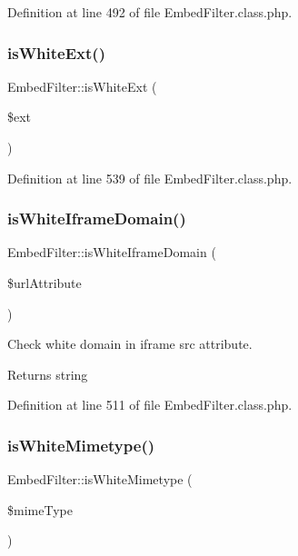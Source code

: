 Definition at line 492 of file Embed\+Filter.\+class.\+php.

\mbox{\label{classEmbedFilter_ae3cc90883fe1fd15c692ab8268ae15b3}} 
\subsubsection{\texorpdfstring{is\+White\+Ext()}{isWhiteExt()}}
{\footnotesize\ttfamily Embed\+Filter\+::is\+White\+Ext (\begin{DoxyParamCaption}\item[{}]{\$ext }\end{DoxyParamCaption})}



Definition at line 539 of file Embed\+Filter.\+class.\+php.

\mbox{\label{classEmbedFilter_ada5403255f1d3612afefdc6d35e03d7f}} 
\subsubsection{\texorpdfstring{is\+White\+Iframe\+Domain()}{isWhiteIframeDomain()}}
{\footnotesize\ttfamily Embed\+Filter\+::is\+White\+Iframe\+Domain (\begin{DoxyParamCaption}\item[{}]{\$url\+Attribute }\end{DoxyParamCaption})}

Check white domain in iframe src attribute. \begin{DoxyReturn}{Returns}
string 
\end{DoxyReturn}


Definition at line 511 of file Embed\+Filter.\+class.\+php.

\mbox{\label{classEmbedFilter_a34e7259c822a6c346a218bea0976e1cd}} 
\subsubsection{\texorpdfstring{is\+White\+Mimetype()}{isWhiteMimetype()}}
{\footnotesize\ttfamily Embed\+Filter\+::is\+White\+Mimetype (\begin{DoxyParamCaption}\item[{}]{\$mime\+Type }\end{DoxyParamCaption})}

